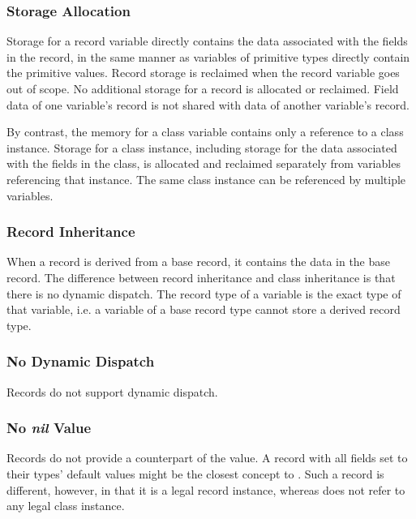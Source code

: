 \subsubsection{Storage Allocation}
\label{Record_Storage}

Storage for a record variable directly contains the data associated
with the fields in the record, in the same manner as variables
of primitive types directly contain the primitive values.
Record storage is reclaimed when the record variable goes out of scope.
No additional storage for a record is allocated or reclaimed.
Field data of one variable's record is not shared with data
of another variable's record.

By contrast, the memory for a class variable contains only a reference to a
class instance.  Storage for a class instance, including storage for
the data associated with the fields in the class, is allocated and reclaimed
separately from variables referencing that instance.  The same class instance
can be referenced by multiple variables.

\subsubsection{Record Inheritance}
\label{Record_Inheritance}

When a record is derived from a base record, it contains the data in
the base record.  The difference between record inheritance and class
inheritance is that there is no dynamic dispatch.  The record type of
a variable is the exact type of that variable, i.e. a variable of a
base record type cannot store a derived record type.

\subsubsection{No Dynamic Dispatch}

Records do not support dynamic dispatch.

\subsubsection{No {\em nil} Value}

Records do not provide a counterpart of the  value.  A record
with all fields set to their types' default values might be the closest
concept to . Such a record is different, however, in that it is
a legal record instance, whereas  does not refer to any
legal class instance.

